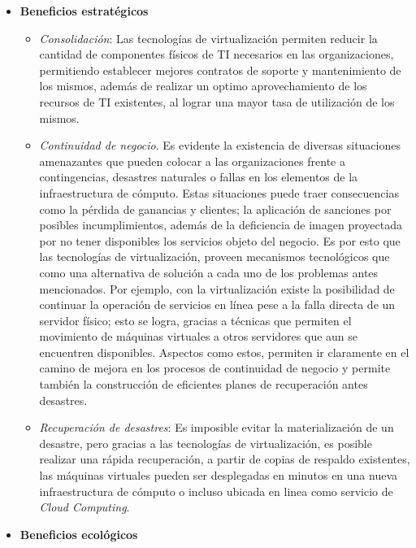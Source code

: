 \begin{itemize}
\begin{itemize}
	\end{itemize}
	\item \textbf{Beneficios estratégicos}\\
	\begin{itemize}
		
		\item \textit{Consolidación}: Las tecnologías de virtualización permiten reducir la cantidad de componentes físicos de TI necesarios en las organizaciones, permitiendo establecer mejores contratos de soporte y mantenimiento de los mismos, además de realizar un optimo aprovechamiento de los recursos de TI existentes, al lograr una mayor tasa de utilización de los mismos.\\
		
		\item \textit{Continuidad de negocio}. Es evidente la existencia de diversas situaciones amenazantes que pueden colocar a las organizaciones frente a contingencias, desastres naturales o fallas en los elementos de la infraestructura de cómputo. Estas situaciones puede traer consecuencias como la pérdida de ganancias y clientes;  la aplicación de sanciones por posibles incumplimientos, además de la deficiencia de imagen proyectada por no tener disponibles los servicios objeto del negocio. Es por esto que las tecnologías de virtualización, proveen mecanismos tecnológicos que como una alternativa de solución a cada uno de los problemas antes mencionados. Por ejemplo, con la virtualización existe la posibilidad de continuar la operación de servicios en línea pese a la falla directa de un servidor físico; esto se logra, gracias a técnicas que permiten el movimiento de máquinas virtuales a otros servidores que aun se encuentren disponibles. Aspectos como estos, permiten ir claramente en el camino de mejora en los procesos de continuidad de negocio y permite también la construcción de eficientes planes de recuperación antes desastres.\\
		
		\item \textit{Recuperación de desastres}: Es imposible evitar la materialización de un desastre, pero gracias a las tecnologías de virtualización, es posible realizar una rápida recuperación, a partir de copias de respaldo existentes, las máquinas virtuales pueden ser desplegadas en minutos en una nueva infraestructura de cómputo o incluso ubicada en linea como servicio de \textit{Cloud Computing}.\\
		
	\end{itemize}
	\item \textbf{Beneficios ecológicos}\\
	\begin{itemize}
		

\end{itemize}
\end{itemize}

